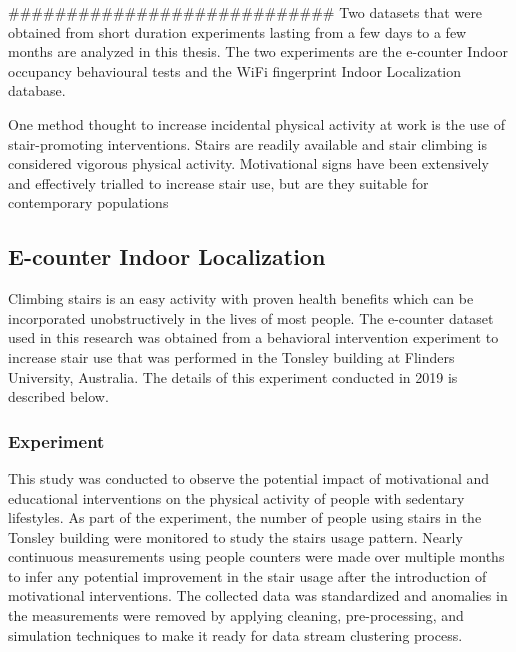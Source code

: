 ############################
Two datasets that were obtained from short duration experiments lasting from a few days to a few months are analyzed in this thesis. The two experiments are the e-counter Indoor occupancy behavioural tests and the WiFi fingerprint Indoor Localization database. 

One method thought to increase incidental physical activity at work is the use of stair-promoting interventions. Stairs are readily available and stair climbing is considered vigorous physical activity. Motivational signs have been extensively and effectively trialled to increase stair use, but are they suitable for contemporary populations


\subsection{E-counter Indoor Localization}
Climbing stairs is an easy activity with proven health benefits which can be incorporated unobstructively in the lives of most people. The e-counter dataset used in this research was obtained from a behavioral intervention experiment to increase stair use that was performed in the Tonsley building at Flinders University, Australia. The details of this experiment conducted in 2019 is described below.


\subsubsection{Experiment}
 This study was conducted to observe the potential impact of motivational and educational interventions on the physical activity of people with sedentary lifestyles. As part of the experiment, the number of people using stairs in the Tonsley building were monitored to study the stairs usage pattern. Nearly continuous measurements using people counters were made over multiple months to infer any potential improvement in the stair usage after the introduction of motivational interventions. The collected data was standardized and anomalies in the measurements were removed by applying cleaning, pre-processing, and simulation techniques to make it ready for data stream clustering process.

